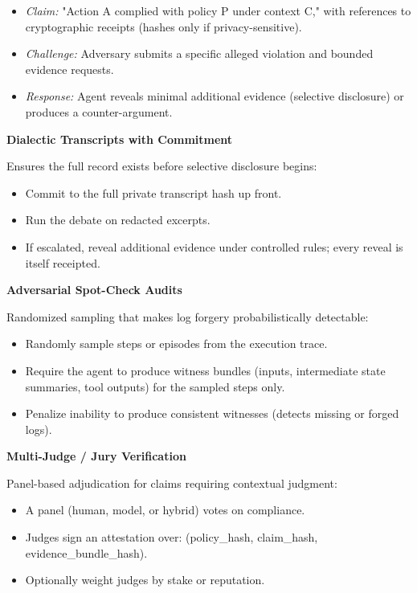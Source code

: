 \documentclass[
  11pt,
]{article}
\providecommand{\tightlist}{%
  \setlength{\itemsep}{0pt}\setlength{\parskip}{0pt}}
\begin{document}
\begin{itemize}
\tightlist
\item
  \emph{Claim:} "Action A complied with policy P under context C," with
  references to cryptographic receipts (hashes only if
  privacy-sensitive).
\item
  \emph{Challenge:} Adversary submits a specific alleged violation and
  bounded evidence requests.
\item
  \emph{Response:} Agent reveals minimal additional evidence (selective
  disclosure) or produces a counter-argument.
\end{itemize}

\textbf{Dialectic Transcripts with Commitment}

Ensures the full record exists before selective disclosure begins:

\begin{itemize}
\tightlist
\item
  Commit to the full private transcript hash up front.
\item
  Run the debate on redacted excerpts.
\item
  If escalated, reveal additional evidence under controlled rules; every
  reveal is itself receipted.
\end{itemize}

\textbf{Adversarial Spot-Check Audits}

Randomized sampling that makes log forgery probabilistically detectable:

\begin{itemize}
\tightlist
\item
  Randomly sample steps or episodes from the execution trace.
\item
  Require the agent to produce witness bundles (inputs, intermediate
  state summaries, tool outputs) for the sampled steps only.
\item
  Penalize inability to produce consistent witnesses (detects missing or
  forged logs).
\end{itemize}

\textbf{Multi-Judge / Jury Verification}

Panel-based adjudication for claims requiring contextual judgment:

\begin{itemize}
\tightlist
\item
  A panel (human, model, or hybrid) votes on compliance.
\item
  Judges sign an attestation over: (policy\_hash, claim\_hash,
  evidence\_bundle\_hash).
\item
  Optionally weight judges by stake or reputation.
\end{itemize}
\end{document}
